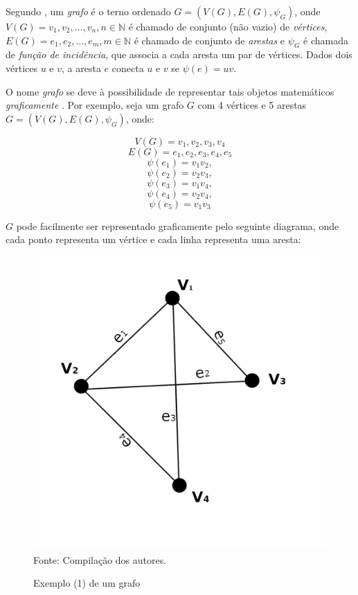 \documentclass[twocolumn, 10pt,a4paper]{extarticle}
\begin{document}
Segundo \cite[p. 1]{bondy}, um \textit{grafo} é o terno ordenado $G = (V(G), E(G), \psi_G)$, onde $V(G) = {v_1, v_2,\dots,v_n}, n \in \mathbb{N}$ é chamado de conjunto (não vazio) de \textit{vértices}, $E(G) = {e_1, e_2,\dots,e_m}, m \in \mathbb{N}$ é chamado de conjunto de \textit{arestas} e $\psi_G$ é chamada de \textit{função de incidência}, que associa a cada aresta um par de vértices. Dados dois vértices $u$ e $v$, a aresta $e$ conecta $u$ e $v$ se $\psi(e) = uv$. 

O nome \textit{grafo} se deve à possibilidade de representar tais objetos matemáticos \textit{graficamente} \cite[p. 2]{bondy}. Por exemplo, seja um grafo $G$ com 4 vértices e 5 arestas $G = (V(G), E(G), \psi_G)$, onde:

\[
V(G) = {v_1, v_2, v_3, v_4}
\]
\[
E(G) = {e_1, e_2, e_3, e_4, e_5}
\]
\[
\psi(e_1) = v_1v_2,\]
\[
\psi(e_2) = v_2v_3, 
\]
\[
\psi(e_3) = v_1v_4,
\]
\[
\psi(e_4) = v_2v_4, 
\]
\[
\psi(e_5) = v_1v_3
\]

$G$ pode facilmente ser representado graficamente pelo seguinte diagrama, onde cada ponto representa um vértice e cada linha representa uma aresta:

\begin{figure}[H]
	\caption{Exemplo (1) de um grafo} 
	\centering
	\includegraphics[scale=0.6]{grafo1}
	\\ Fonte: Compilação dos autores.
\end{figure}
\end{document}
